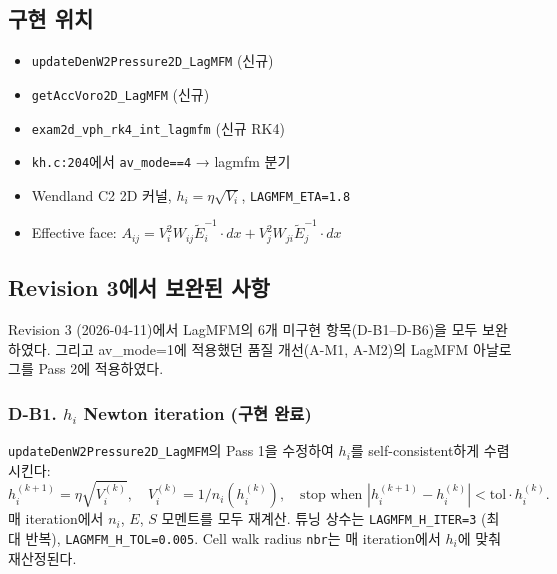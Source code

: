 \documentclass[11pt]{article}
\begin{document}
\subsection{구현 위치}
\begin{itemize}
  \item \texttt{updateDenW2Pressure2D\_LagMFM} (신규)
  \item \texttt{getAccVoro2D\_LagMFM} (신규)
  \item \texttt{exam2d\_vph\_rk4\_int\_lagmfm} (신규 RK4)
  \item \texttt{kh.c:204}에서 \texttt{av\_mode==4} → lagmfm 분기
  \item Wendland C2 2D 커널, $h_i = \eta\sqrt{V_i}$, \texttt{LAGMFM\_ETA=1.8}
  \item Effective face: $A_{ij} = V_i^2 W_{ij}\tilde E_i^{-1}\cdot dx + V_j^2 W_{ji}\tilde E_j^{-1}\cdot dx$
\end{itemize}

\subsection{Revision 3에서 보완된 사항}
\label{sec:av4rev3}

Revision 3 (2026-04-11)에서 LagMFM의 6개 미구현 항목(D-B1--D-B6)을 모두
보완하였다. 그리고 av\_mode=1에 적용했던 품질 개선(A-M1, A-M2)의 LagMFM
아날로그를 Pass 2에 적용하였다.

\subsubsection*{D-B1. $h_i$ Newton iteration (구현 완료)}
\texttt{updateDenW2Pressure2D\_LagMFM}의 Pass 1을 수정하여
$h_i$를 self-consistent하게 수렴시킨다:
\[
 h_i^{(k+1)} = \eta\sqrt{V_i^{(k)}},\quad V_i^{(k)} = 1/n_i(h_i^{(k)}),\quad
 \text{stop when } |h_i^{(k+1)} - h_i^{(k)}| < \mathrm{tol}\cdot h_i^{(k)}.
\]
매 iteration에서 $n_i$, $E$, $S$ 모멘트를 모두 재계산. 튜닝 상수는
\texttt{LAGMFM\_H\_ITER=3} (최대 반복), \texttt{LAGMFM\_H\_TOL=0.005}.
Cell walk radius \texttt{nbr}는 매 iteration에서 $h_i$에 맞춰 재산정된다.
\end{document}
